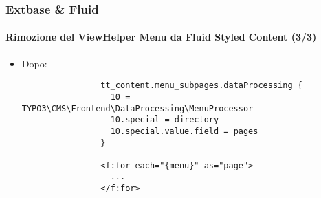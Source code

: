 
\begin{frame}[fragile]
	\frametitle{Extbase \& Fluid}
	\framesubtitle{Rimozione del ViewHelper Menu da Fluid Styled Content (3/3)}

	\lstset{basicstyle=\tiny\ttfamily}

	\begin{itemize}

		\item Dopo:

			\begin{lstlisting}
				tt_content.menu_subpages.dataProcessing {
				  10 = TYPO3\CMS\Frontend\DataProcessing\MenuProcessor
				  10.special = directory
				  10.special.value.field = pages
				}

				<f:for each="{menu}" as="page">
				  ...
				</f:for>
			\end{lstlisting}

	\end{itemize}

\end{frame}


